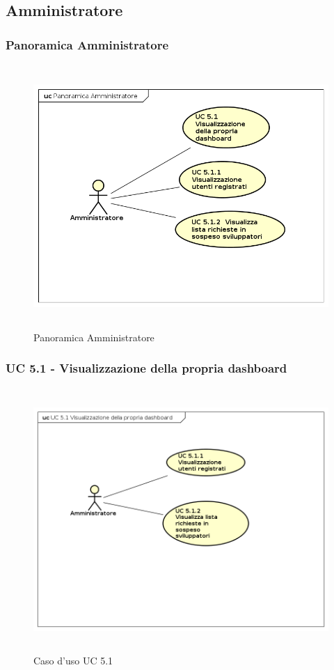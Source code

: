 \subsection{Amministratore}

\subsubsection{Panoramica Amministratore}
\begin{figure}[H]
\centering
\includegraphics[width=17cm, height=10cm]{img/PanoramicaAmministratore.png} 
\caption{Panoramica Amministratore}
\end{figure}


\subsubsection{UC 5.1 - Visualizzazione della propria dashboard}


\begin{figure}[H]
\centering
\includegraphics[width=17cm, height=10cm]{img/UC51.png} 
\caption{Caso d'uso UC 5.1}
\end{figure}


